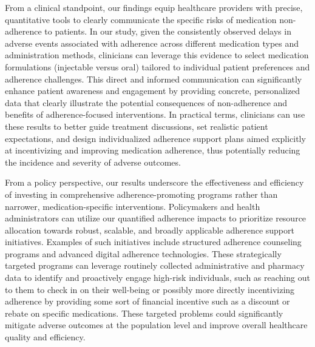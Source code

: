 From a clinical standpoint, our findings equip healthcare providers with precise, quantitative tools to clearly communicate the specific risks of medication non-adherence to patients. In our study, given the consistently observed delays in adverse events associated with adherence across different medication types and administration methods, clinicians can leverage this evidence to select medication formulations (injectable versus oral) tailored to individual patient preferences and adherence challenges. This direct and informed communication can significantly enhance patient awareness and engagement by providing concrete, personalized data that clearly illustrate the potential consequences of non-adherence and benefits of adherence-focused interventions. In practical terms, clinicians can use these results to better guide treatment discussions, set realistic patient expectations, and design individualized adherence support plans aimed explicitly at incentivizing and improving medication adherence, thus potentially reducing the incidence and severity of adverse outcomes.

From a policy perspective, our results underscore the effectiveness and efficiency of investing in comprehensive adherence-promoting programs rather than narrower, medication-specific interventions. Policymakers and health administrators can utilize our quantified adherence impacts to prioritize resource allocation towards robust, scalable, and broadly applicable adherence support initiatives. Examples of such initiatives include structured adherence counseling programs and advanced digital adherence technologies. These strategically targeted programs can leverage routinely collected administrative and pharmacy data to identify and proactively engage high-risk individuals, such as reaching out to them to check in on their well-being or possibly more directly incentivizing adherence by providing some sort of financial incentive such as a discount or rebate on specific medications. These targeted problems could significantly mitigate adverse outcomes at the population level and improve overall healthcare quality and efficiency.

